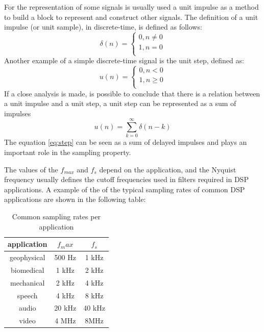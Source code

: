 For the representation of some signals is usually used a unit impulse as a method to build a block to represent and construct other signals. The definition of a unit impulse (or unit sample), in discrete-time, is defined as follows:
\begin{equation}
    \delta(n) = \left\{ \begin{matrix} 
    0, n \ne 0\\
    1, n = 0\\
    \end{matrix}\right.
\end{equation}
Another example of a simple discrete-time signal is the unit step, defined as:
\begin{equation}
    u(n) = \left\{ \begin{matrix} 
    0, n < 0\\
    1, n \geq 0\\
    \end{matrix}\right.
\end{equation}
If a close analysis is made, is possible to conclude that there is a relation between a unit impulse and a unit step, a unit step can be represented as a sum of impulses
\begin{equation}\label{eq:step}
    u(n) = \sum_{k=0}^{\infty}\delta(n-k)
\end{equation}
The equation \ref{eq:step} can be seen as a sum of delayed impulses and plays an important role in the sampling property.

The values of the $f_{max}$ and $f_s$ depend on the application, and the Nyquist frequency usually defines the cutoff frequencies used in filters required in DSP applications. A example of the of the typical sampling rates of common DSP applications are shown in the following table:   
\begin{table}[]
   \centering
   \begin{tabular}{|c|c|c|} \toprule
       {application}&{$f_max$}&{$f_s$}\\
       \toprule
       {geophysical}&{500 Hz}&{1 kHz}\\
       {biomedical}&{1 kHz}&{2 kHz}\\
       {mechanical}&{2 kHz}&{4 kHz}\\
       {speech}&{4 kHz}&{8 kHz}\\
       {audio}&{20 kHz}&{40 kHz}\\
       {video}&{4 MHz}&{8MHz}\\
       \bottomrule
   \end{tabular} 
   \caption{Common sampling rates per application}{~\cite{orfanidisIntroductionSignalProcessing1996}}  
    \label{tab:sampRat}     
\end{table} 

